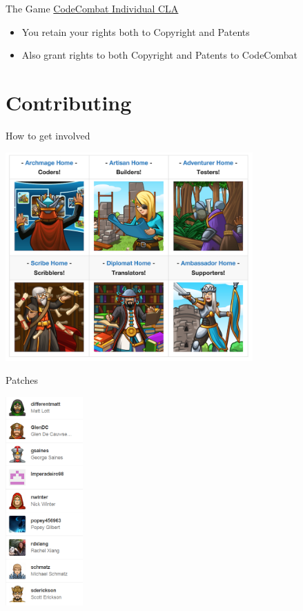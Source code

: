 \documentclass[10pt, compress]{beamer}
\begin{document}
\begin{frame}{The Game}
    \href{http://codecombat.com/cla}{CodeCombat Individual CLA}
    \begin{itemize}
    \item You retain your rights both to Copyright and Patents
    \item Also grant rights to both Copyright and Patents to CodeCombat
    \end{itemize}
\end{frame}

\section{Contributing}

\begin{frame}{How to get involved}
    \centerline{\includegraphics[width=\textwidth,height=8cm, keepaspectratio]{images/getinvolved.png}}
\end{frame}

\begin{frame}{Patches}
   \centerline{\includegraphics[width=\textwidth, height=8cm, keepaspectratio]{images/close.png}}
    
\end{frame}
\end{document}
